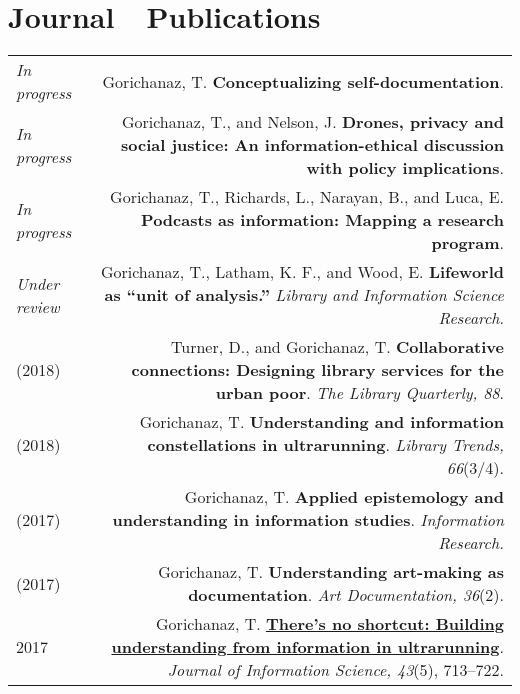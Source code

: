 \documentclass[letterpaper,11pt]{article}
\begin{document}
\medskip

\section*{Journal~~Publications}
\begin{longtable}{ @{} L @{} R @{} }
\emph{In progress}&	Gorichanaz, T. \textbf{Conceptualizing self-documentation}.\\[1em]

\emph{In progress}&	Gorichanaz, T., and Nelson, J. \textbf{Drones, privacy and social justice: An information-ethical discussion with policy implications}.\\[1em]

\emph{In progress}&	Gorichanaz, T., Richards, L., Narayan, B., and Luca, E. \textbf{Podcasts as information: Mapping a research program}.\\[1em]

\emph{Under review}&	Gorichanaz, T., Latham, K. F., and Wood, E. \textbf{Lifeworld as ``unit of analysis.''} \emph{Library and Information Science Research}.\\[1em]

\hspace{-\myl}(2018)&	Turner, D., and Gorichanaz, T. \textbf{Collaborative connections: Designing library services for the urban poor}. \emph{The Library Quarterly, 88}.\\[1em]

\hspace{-\myl}(2018)&	Gorichanaz, T. \textbf{Understanding and information constellations in ultrarunning}. \emph{Library Trends, 66}(3/4).\\[1em]

\hspace{-\myl}(2017)&	Gorichanaz, T. \textbf{Applied epistemology and understanding in information studies}. \emph{Information Research.} \\[1em]

\hspace{-\myl}(2017)&	Gorichanaz, T. \textbf{Understanding art-making as documentation}. \emph{Art Documentation, 36}(2).\\[1em] 

2017&	Gorichanaz, T. \href{http://jis.sagepub.com/content/early/2016/10/12/0165551516670099.full}{\textbf{There’s no shortcut: Building understanding from information in ultrarunning}}. \emph{Journal of Information Science, 43}(5), 713--722.\\[1em]


\end{longtable}
\end{document}
